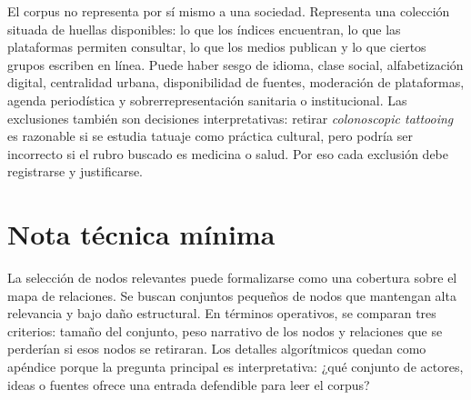 \documentclass[11pt]{article}
\begin{document}
El corpus no representa por sí mismo a una sociedad. Representa una colección
situada de huellas disponibles: lo que los índices encuentran, lo que las
plataformas permiten consultar, lo que los medios publican y lo que ciertos
grupos escriben en línea. Puede haber sesgo de idioma, clase social,
alfabetización digital, centralidad urbana, disponibilidad de fuentes,
moderación de plataformas, agenda periodística y sobrerrepresentación sanitaria
o institucional. Las exclusiones también son decisiones interpretativas: retirar
\textit{colonoscopic tattooing} es razonable si se estudia tatuaje como práctica
cultural, pero podría ser incorrecto si el rubro buscado es medicina o salud.
Por eso cada exclusión debe registrarse y justificarse.

\appendix
\section{Nota técnica mínima}

La selección de nodos relevantes puede formalizarse como una cobertura sobre el
mapa de relaciones. Se buscan conjuntos pequeños de nodos que mantengan alta
relevancia y bajo daño estructural. En términos operativos, se comparan tres
criterios: tamaño del conjunto, peso narrativo de los nodos y relaciones que se
perderían si esos nodos se retiraran. Los detalles algorítmicos quedan como
apéndice porque la pregunta principal es interpretativa: ¿qué conjunto de
actores, ideas o fuentes ofrece una entrada defendible para leer el corpus?


\end{document}
